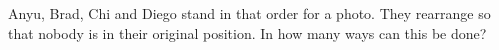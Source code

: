 Anyu, Brad, Chi and Diego stand in that order for a photo. They rearrange so that nobody is in their original position. In how many ways can this be done?
